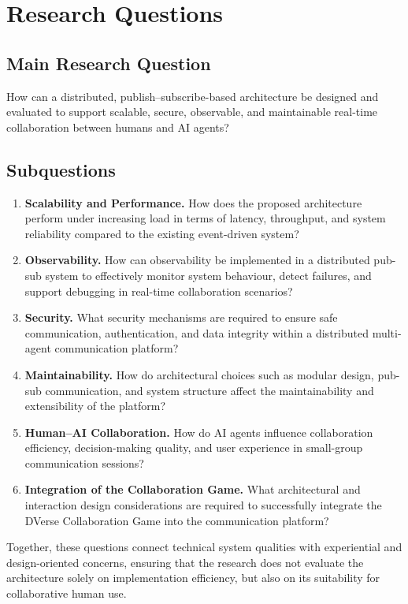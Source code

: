 \documentclass[11pt]{article}
\begin{document}
\section{Research Questions}

\subsection{Main Research Question}

How can a distributed, publish--subscribe-based architecture be designed and evaluated to support scalable, secure, observable, and maintainable real-time collaboration between humans and AI agents?

\subsection{Subquestions}

\begin{enumerate}[label=\textbf{SQ\arabic*}.]
    \item \textbf{Scalability and Performance.} How does the proposed architecture perform under increasing load in terms of latency, throughput, and system reliability compared to the existing event-driven system?
    \item \textbf{Observability.} How can observability be implemented in a distributed pub-sub system to effectively monitor system behaviour, detect failures, and support debugging in real-time collaboration scenarios?
    \item \textbf{Security.} What security mechanisms are required to ensure safe communication, authentication, and data integrity within a distributed multi-agent communication platform?
    \item \textbf{Maintainability.} How do architectural choices such as modular design, pub-sub communication, and system structure affect the maintainability and extensibility of the platform?
    \item \textbf{Human--AI Collaboration.} How do AI agents influence collaboration efficiency, decision-making quality, and user experience in small-group communication sessions?
    \item \textbf{Integration of the Collaboration Game.} What architectural and interaction design considerations are required to successfully integrate the DVerse Collaboration Game into the communication platform?
\end{enumerate}

Together, these questions connect technical system qualities with experiential and design-oriented concerns, ensuring that the research does not evaluate the architecture solely on implementation efficiency, but also on its suitability for collaborative human use.
\end{document}
